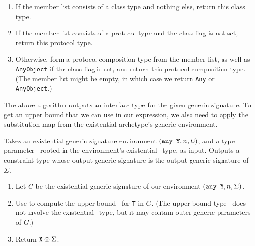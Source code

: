 \documentclass[../generics]{subfiles}
\begin{document}
\begin{algorithm}
\begin{enumerate}
\begin{enumerate}
\begin{enumerate}
\item Add this reduced type to the list of generic arguments.
\end{enumerate}
\item If any generic arguments in the above list have the same root generic parameter as \tT, drop all generic arguments, add the declared interface type of \tP\ to the member list, and continue the loop in Step~4.
\item Otherwise, form a parameterized protocol type for \tP\ together with the above generic arguments, and add it to the member list.
\end{enumerate}
\item If the member list consists of a class type and nothing else, return this class type.
\item If the member list consists of a protocol type and the class flag is not set, return this protocol type.
\item Otherwise, form a protocol composition type from the member list, as well as \texttt{AnyObject} if the class flag is set, and return this protocol composition type. (The member list might be empty, in which case we return \texttt{Any} or \texttt{AnyObject}.)
\end{enumerate}
\end{algorithm}

The above algorithm outputs an interface type for the given generic signature. To get an upper bound that we can use in our expression, we also need to apply the substitution map from the existential archetype's generic environment.

\begin{algorithm}\label{alg:erase existential archetype}
Takes an existential generic signature environment $(\texttt{any~Y},n,\Sigma)$, and a type parameter \tT\ rooted in the environment's existential \tSelf\ type, as input. Outputs a constraint type whose output generic signature is the output generic signature of $\Sigma$.
\begin{enumerate}
\item Let $G$ be the existential generic signature of our environment $(\texttt{any~Y},n,\Sigma)$.
\item Use  to compute the upper bound \tX\ for \texttt{T} in $G$. (The upper bound type \tX\ does not involve the existential \tSelf\ type, but it may contain outer generic parameters of $G$.)
\item Return $\texttt{X} \otimes \Sigma$.
\end{enumerate}
\end{algorithm}
\end{document}
